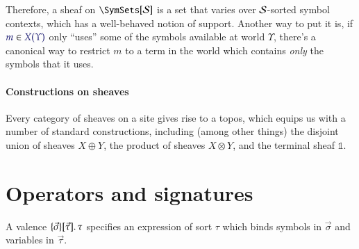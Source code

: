 Therefore, a sheaf on $\SCtxSite$ is a set that varies over $\mathcal{S}$-sorted
symbol contexts, which has a well-behaved notion of support. Another way to put
it is, if $\Member{m}{X(\Upsilon)}$ only ``uses'' some of the symbols available
at world $\Upsilon$, there's a canonical way to restrict $m$ to a term in the
world which contains \emph{only} the symbols that it uses.

\paragraph{Constructions on sheaves}



Every category of sheaves on a site gives rise to a topos, which equips us with
a number of standard constructions, including (among other things) the disjoint
union of sheaves $X\oplus Y$, the product of sheaves $X\otimes Y$, and the terminal sheaf $\mathbb{1}$.

\section{Operators and signatures}

A valence $\MkValence{\vec{\sigma}}{\vec{\tau}}{\tau}$ specifies an expression
of sort $\tau$ which binds symbols in $\vec{\sigma}$ and variables in
$\vec{\tau}$.

